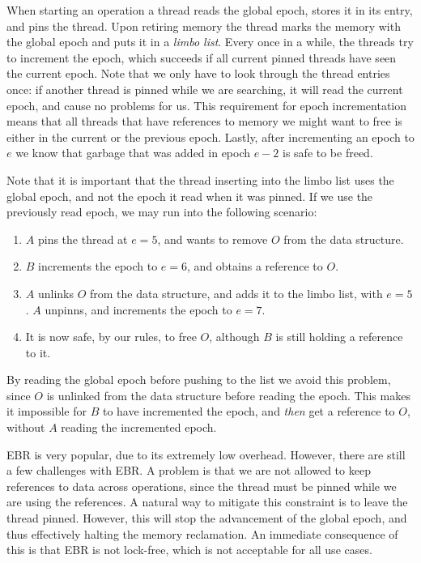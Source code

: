 \documentclass[b5paper]{report}
\begin{document}
When starting an operation a thread reads the global epoch, stores it in its
entry, and pins the thread. Upon retiring memory the thread marks the memory
with the global epoch and puts it in a \emph{limbo list}. Every once in a while,
the threads try to increment the epoch, which succeeds if all current pinned
threads have seen the current epoch. Note that we only have to look through the
thread entries once: if another thread is pinned while we are searching, it will
read the current epoch, and cause no problems for us. This requirement for
epoch incrementation means that all threads that have references to memory we
might want to free is either in the current or the previous epoch. Lastly, after
incrementing an epoch to $e$ we know that garbage that was added in epoch $e-2$
is safe to be freed.

Note that it is important that the thread inserting into the limbo list uses the
global epoch, and not the epoch it read when it was pinned. If we use the
previously read epoch, we may run into the following scenario:
\begin{enumerate}
  \item $A$ pins the thread at $e=5$, and wants to remove $O$ from the data structure.
  \item $B$ increments the epoch to $e=6$, and obtains a reference to $O$.
  \item $A$ unlinks $O$ from the data structure, and adds it to the limbo list,
    with $e=5$. $A$ unpinns, and increments the epoch to $e=7$.
  \item It is now safe, by our rules, to free $O$, although $B$ is still holding
    a reference to it.
\end{enumerate}
By reading the global epoch before pushing to the list we avoid this problem,
since $O$ is unlinked from the data structure before reading the epoch. This
makes it impossible for $B$ to have incremented the epoch, and \emph{then} get a
reference to $O$, without $A$ reading the incremented epoch.

EBR is very popular, due to its extremely low overhead.  However, there are
still a few challenges with EBR\@. A problem is that we are not allowed to keep
references to data across operations, since the thread must be pinned while we
are using the references. A natural way to mitigate this constraint is to leave
the thread pinned. However, this will stop the advancement of the global epoch,
and thus effectively halting the memory reclamation. An immediate consequence of
this is that EBR is not lock-free, which is not acceptable for all use cases.
\end{document}
